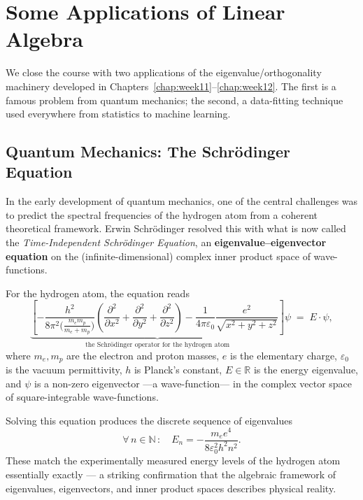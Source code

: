 \documentclass[11pt, a4paper, notitlepage]{report}
\theoremstyle{definition}
\theoremstyle{remark}
\begin{document}
\section{Some Applications of Linear Algebra}
\label{sec:applications}

We close the course with two applications of the eigenvalue/orthogonality
machinery developed in Chapters~\ref{chap:week11}--\ref{chap:week12}.
The first is a famous problem from quantum mechanics; the second, a
data-fitting technique used everywhere from statistics to machine learning.

\subsection{Quantum Mechanics: The Schr\"odinger Equation}
\label{subsec:schrodinger}

In the early development of quantum mechanics, one of the central challenges
was to predict the spectral frequencies of the hydrogen atom from a coherent
theoretical framework. Erwin Schr\"odinger resolved this with what is now
called the \emph{Time-Independent Schr\"odinger Equation}, an
\textbf{eigenvalue--eigenvector equation} on the (infinite-dimensional)
complex inner product space of wave-functions.

For the hydrogen atom, the equation reads
\[
  \underbrace{\left[
    -\frac{h^2}{8\pi^2\bigl(\tfrac{m_e m_p}{m_e + m_p}\bigr)}
    \left(\frac{\partial^2}{\partial x^2}+\frac{\partial^2}{\partial y^2}+\frac{\partial^2}{\partial z^2}\right)
    -\frac{1}{4\pi\varepsilon_0}\frac{e^2}{\sqrt{x^2+y^2+z^2}}
  \right]}_{\text{the Schr\"odinger operator for the hydrogen atom}}
  \psi \;=\; E\cdot\psi,
\]
where $m_e, m_p$ are the electron and proton masses, $e$ is the elementary
charge, $\varepsilon_0$ is the vacuum permittivity, $h$ is Planck's constant,
$E\in\mathbb{R}$ is the energy eigenvalue, and $\psi$ is a non-zero
eigenvector ---a wave-function--- in the complex vector space of
square-integrable wave-functions.

Solving this equation produces the discrete sequence of eigenvalues
\[
  \forall\,n\in\mathbb{N}\,:\quad
  E_n = -\frac{m_e e^4}{8\varepsilon_0^2 h^2 n^2}.
\]
These match the experimentally measured energy levels of the hydrogen
atom essentially exactly --- a striking confirmation that the algebraic
framework of eigenvalues, eigenvectors, and inner product spaces describes
physical reality.
\end{document}
